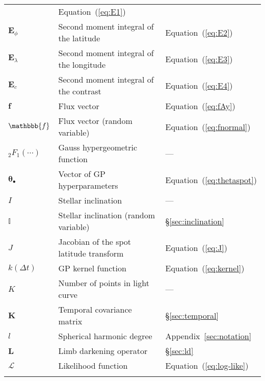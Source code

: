 \begin{center}
\begin{longtable}{W{c}{1cm} W{l}{9cm} W{l}{2cm}}
         & Equation~(\ref{eq:E1})
        \\
        $\mathbf{E}_\phi$
         & Second moment integral of the latitude
         & Equation~(\ref{eq:E2})
        \\
        $\mathbf{E}_\lambda$
         & Second moment integral of the longitude
         & Equation~(\ref{eq:E3})
        \\
        $\mathbf{E}_c$
         & Second moment integral of the contrast
         & Equation~(\ref{eq:E4})
        \\
        $\mathbf{f}$
         & Flux vector
         & Equation~(\ref{eq:fAy})
        \\
        $\mathbbb{f}$
         & Flux vector (random variable)
         & Equation~(\ref{eq:fnormal})
        \\
        ${_2}F_1(\cdots)$
         & Gauss hypergeometric function
         & ---
        \\
        $\pmb{\theta}_\bullet$
         & Vector of GP hyperparameters
         & Equation~(\ref{eq:thetaspot})
        \\
        $I$
         & Stellar inclination
         & ---
        \\
        $\mathbb{I}$
         & Stellar inclination (random variable)
         & \S\ref{sec:inclination}
        \\
        $J$
         & Jacobian of the spot latitude transform
         & Equation~(\ref{eq:J})
        \\
        $k(\Delta t)$
         & GP kernel function
         & Equation~(\ref{eq:kernel})
        \\
        $K$
         & Number of points in light curve
         & ---
        \\
        $\mathbf{K}$
         & Temporal covariance matrix
         & \S\ref{sec:temporal}
        \\
        $l$
         & Spherical harmonic degree
         & Appendix~\ref{sec:notation}
        \\
        $\mathbf{L}$
         & Limb darkening operator
         & \S\ref{sec:ld}
        \\
        $\mathcal{L}$
         & Likelihood function
         & Equation~(\ref{eq:log-like})
        \\
        \pagebreak %

\end{longtable}
\end{center}
